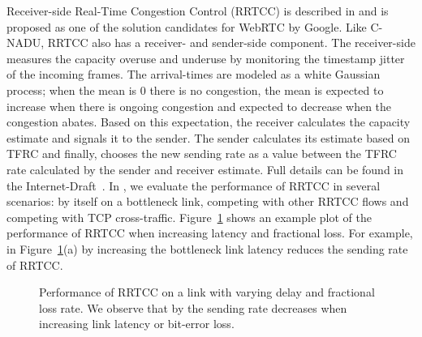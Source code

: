 Receiver-side Real-Time Congestion Control (RRTCC) is described in
\cite{draft.rrtcc} and is proposed as one of the solution candidates for
WebRTC by Google. Like C-NADU, RRTCC also has a receiver- and sender-side
component. The receiver-side measures the capacity overuse and underuse by
monitoring the timestamp jitter of the incoming frames. The arrival-times are
modeled as a white Gaussian process; when the mean is 0 there is no
congestion, the mean is expected to increase when there is ongoing congestion
and expected to decrease when the congestion abates. Based on this
expectation, the receiver calculates the capacity estimate and signals it to
the sender. The sender calculates its estimate based on TFRC and finally,
chooses the new sending rate as a value between the TFRC rate calculated by
the sender and receiver estimate. Full details can be found in the
Internet-Draft~\cite{draft.rrtcc}. In , we evaluate the
performance of RRTCC in several scenarios: by itself on a bottleneck link,
competing with other RRTCC flows and competing with TCP cross-traffic.
Figure~\ref{fig:rrtcc} shows an example plot of the performance of RRTCC when
increasing latency and fractional loss. For example, in
Figure~\ref{fig:rrtcc}(a) by increasing the bottleneck link latency reduces
the sending rate of RRTCC.

\begin{figure}
  \centerline{
   }
   \centerline{
  }
  \caption{Performance of RRTCC on a link with varying delay and fractional
  loss rate. We observe that by the sending rate decreases when increasing
  link latency or bit-error loss. }
  \label{fig:rrtcc}
\end{figure}

% 
